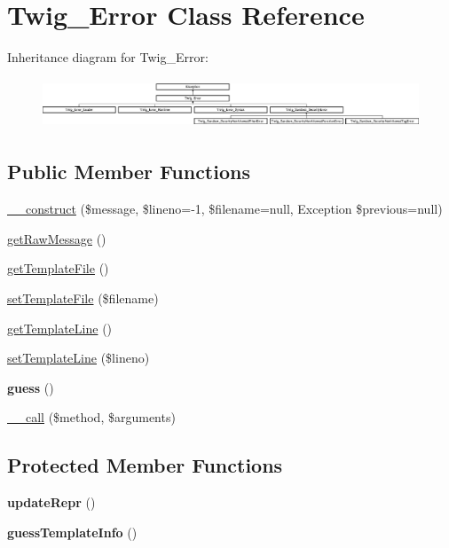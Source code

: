 \hypertarget{class_twig___error}{}\section{Twig\+\_\+\+Error Class Reference}
\label{class_twig___error}
Inheritance diagram for Twig\+\_\+\+Error\+:\begin{figure}[H]
\begin{center}
\leavevmode
\includegraphics[height=1.498328cm]{class_twig___error}
\end{center}
\end{figure}
\subsection*{Public Member Functions}
\begin{DoxyCompactItemize}
\item 
\hyperlink{class_twig___error_a61443b1ca6c32f74ff85c2fd550110cf}{\+\_\+\+\_\+construct} (\$message, \$lineno=-\/1, \$filename=null, Exception \$previous=null)
\item 
\hyperlink{class_twig___error_ae10360028f8c467cf5855bcaf76b091f}{get\+Raw\+Message} ()
\item 
\hyperlink{class_twig___error_a7d4dd918a3bd7ea19213e1745e7b4944}{get\+Template\+File} ()
\item 
\hyperlink{class_twig___error_aecc0e5e79dece93715f37d05a9bec2ae}{set\+Template\+File} (\$filename)
\item 
\hyperlink{class_twig___error_abe0a6ba69feb4cba19f4a408462a976e}{get\+Template\+Line} ()
\item 
\hyperlink{class_twig___error_a8c9d5c088f27156f8fffa52222efbe29}{set\+Template\+Line} (\$lineno)
\item 
\hypertarget{class_twig___error_a16664471dad3413d0fb0370b4068d634}{}{\bfseries guess} ()\label{class_twig___error_a16664471dad3413d0fb0370b4068d634}

\item 
\hyperlink{class_twig___error_acfa40ec504c3c792c3b84cf2f1af511d}{\+\_\+\+\_\+call} (\$method, \$arguments)
\end{DoxyCompactItemize}
\subsection*{Protected Member Functions}
\begin{DoxyCompactItemize}
\item 
\hypertarget{class_twig___error_a94da5702d909e30f9dafe5f95c67bf1b}{}{\bfseries update\+Repr} ()\label{class_twig___error_a94da5702d909e30f9dafe5f95c67bf1b}

\item 
\hypertarget{class_twig___error_ae755138687d06c7ddb918be2c55c215d}{}{\bfseries guess\+Template\+Info} ()\label{class_twig___error_ae755138687d06c7ddb918be2c55c215d}

\end{DoxyCompactItemize}
